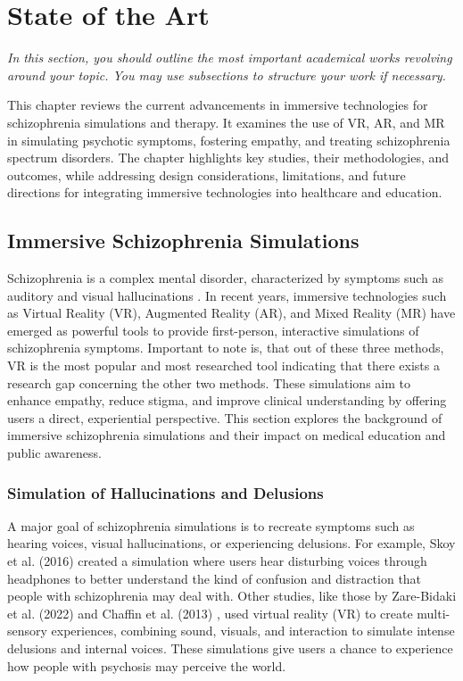 \chapter{State of the Art}
\label{ch:background}

\emph{In this section, you should outline the most important academical works revolving around your topic. You may use subsections to structure your work if necessary.}


This chapter reviews the current advancements in immersive technologies for schizophrenia simulations and therapy. It examines the use of VR, AR, and MR in simulating psychotic symptoms, fostering empathy, and treating schizophrenia spectrum disorders. The chapter highlights key studies, their methodologies, and outcomes, while addressing design considerations, limitations, and future directions for integrating immersive technologies into healthcare and education.

\section{Immersive Schizophrenia Simulations}
Schizophrenia is a complex mental disorder, characterized by symptoms such as auditory and visual hallucinations \cite{Silverstein2021}. In recent years, immersive technologies such as Virtual Reality (VR), Augmented Reality (AR), and Mixed Reality (MR) have emerged as powerful tools to provide first-person, interactive simulations of schizophrenia symptoms. Important to note is, that out of these three methods, VR is the most popular and most researched tool \cite{Kuhail2022} indicating that there exists a research gap concerning the other two methods. These simulations aim to enhance empathy, reduce stigma, and improve clinical understanding by offering users a direct, experiential perspective. This section explores the background of immersive schizophrenia simulations and their impact on medical education and public awareness.


\subsection{Simulation of Hallucinations and Delusions}
A major goal of schizophrenia simulations is to recreate symptoms such as hearing voices, visual hallucinations, or experiencing delusions. For example, Skoy et al. (2016) \cite{Skoy2016} created a simulation where users hear disturbing voices through headphones to better understand the kind of confusion and distraction that people with schizophrenia may deal with. Other studies, like those by Zare-Bidaki et al. (2022) \cite{Zare-Bidaki2022} and Chaffin et al. (2013) \cite{Chaffin2013}, used virtual reality (VR) to create multi-sensory experiences, combining sound, visuals, and interaction to simulate intense delusions and internal voices. These simulations give users a chance to experience how people with psychosis may perceive the world.

